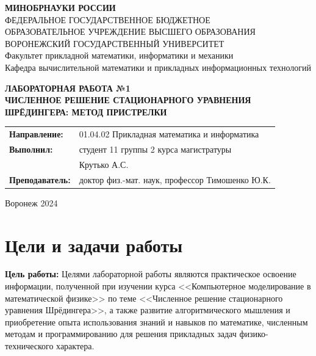 \documentclass[a4paper,12pt]{article}
\begin{document}
\begin{center}
\textbf{МИНОБРНАУКИ РОССИИ}\\
ФЕДЕРАЛЬНОЕ ГОСУДАРСТВЕННОЕ БЮДЖЕТНОЕ \\
ОБРАЗОВАТЕЛЬНОЕ УЧРЕЖДЕНИЕ ВЫСШЕГО ОБРАЗОВАНИЯ \\
ВОРОНЕЖСКИЙ ГОСУДАРСТВЕННЫЙ УНИВЕРСИТЕТ \\
Факультет прикладной математики, информатики и механики\\
Кафедра вычислительной математики и прикладных информационных технологий
\end{center}

\vspace{2cm}
\begin{center}
\textbf{ЛАБОРАТОРНАЯ РАБОТА №1}\\
\textbf{ЧИСЛЕННОЕ РЕШЕНИЕ СТАЦИОНАРНОГО УРАВНЕНИЯ ШРЁДИНГЕРА: МЕТОД ПРИСТРЕЛКИ}
\end{center}

\vspace{3cm}
\begin{flushright}
\begin{tabular}{l l}
\textbf{Направление:} & 01.04.02 \textendash{} Прикладная математика и информатика \\
\textbf{Выполнил:} & студент 11 группы 2 курса магистратуры \\
& Крутько А.С. \\
\textbf{Преподаватель:} & доктор физ.-мат. наук, профессор Тимошенко Ю.К.
\end{tabular}
\end{flushright}

\vspace{3cm}
\begin{center}
Воронеж 2024
\end{center}

\newpage
\tableofcontents

\newpage
\section{Цели и задачи работы}\label{sec:---}
\textbf{Цель работы:}
Целями лабораторной работы являются практическое освоение информации, полученной при изучении курса <<Компьютерное моделирование в математической физике>> по теме <<Численное решение стационарного уравнения Шрёдингера>>, а также развитие алгоритмического мышления и приобретение опыта использования знаний и навыков по математике, численным методам и программированию для решения прикладных задач физико-технического характера.
\end{document}
